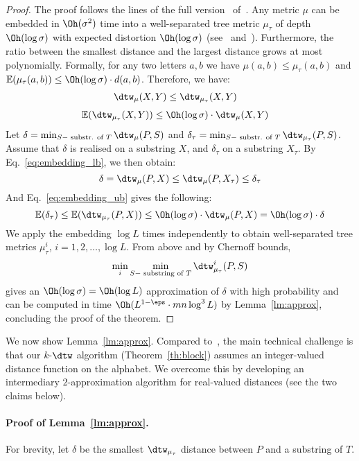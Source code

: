 \begin{proof}
  The proof follows the lines of the full version~\cite{https://doi.org/10.48550/arxiv.1904.09690} of~\cite{DBLP:conf/icalp/Kuszmaul19}.
  Any metric $\mu$ can be embedded in $\Oh(\sigma^2)$ time into a well-separated tree metric $\mu_\tau$ of depth $\Oh(\log \sigma)$ with expected distortion $\Oh(\log \sigma)$ (see~\cite{embedding} and~\cite[Theorem 2.4]{treedepth}). Furthermore, the ratio between the smallest distance and the largest distance grows at most polynomially. Formally, for any two letters $a, b$ we have $\mu(a,b) \le \mu_\tau(a,b)$ and $\mathbb{E}(\mu_\tau(a,b)) \le \Oh(\log \sigma) \cdot d(a,b)$. 
  Therefore, we have: 
  \begin{align}
  \label{eq:embedding_lb}
  \dtw_{\mu}(X,Y) &\le \dtw_{\mu_\tau}(X,Y)
  \end{align}
  \begin{align}
  \label{eq:embedding_ub}
  \mathbb{E}(\dtw_{\mu_\tau}(X,Y)) &\le \Oh(\log \sigma) \cdot \dtw_\mu (X,Y)
  \end{align}
  Let $\delta = \min_{S-\text{ substr. of }T} \dtw_\mu (P,S)$ and $\delta_\tau = \min_{S-\text{ substr. of }T} \dtw_{\mu_\tau} (P,S)$. Assume that $\delta$ is realised on a substring $X$, and $\delta_\tau$ on a substring $X_\tau$. By Eq.~\ref{eq:embedding_lb}, we then obtain:
  $$\delta = \dtw_\mu(P,X) \le \dtw_\mu (P,X_\tau) \le \delta_\tau$$
  And Eq.~\ref{eq:embedding_ub} gives the following:
  $$\mathbb{E}(\delta_\tau) \le \mathbb{E}(\dtw_{\mu_\tau} (P,X)) \le \Oh(\log \sigma) \cdot \dtw_\mu(P,X) = \Oh(\log \sigma) \cdot \delta$$
  We apply the embedding $\log L$ times independently to obtain well-separated tree metrics $\mu_\tau^i$, $i = 1, 2, \ldots, \log L$. From above and by Chernoff bounds, 
  $$\min_i \min_{S-\text{ substring of }T} \dtw_{\mu_\tau}^i(P,S)$$
  gives an $\Oh(\log \sigma) = \Oh(\log L)$ approximation of $\delta$ with high probability and can be computed in time $\Oh (L^{1-\eps} \cdot mn \log^3 L)$ by Lemma~\ref{lm:approx}, concluding the proof of the theorem. 
\end{proof}
  

We now show Lemma~\ref{lm:approx}. Compared to~\cite{DBLP:conf/icalp/Kuszmaul19}, the main technical challenge is that our $k$-$\dtw$ algorithm (Theorem~\ref{th:block}) assumes an integer-valued distance function on the alphabet. We overcome this by developing an intermediary $2$-approximation algorithm for real-valued distances (see the two claims below). 

\paragraph{Proof of Lemma~\ref{lm:approx}.} For brevity, let $\delta$ be the smallest $\dtw_{\mu_\tau}$ distance between $P$ and a substring of $T$.

